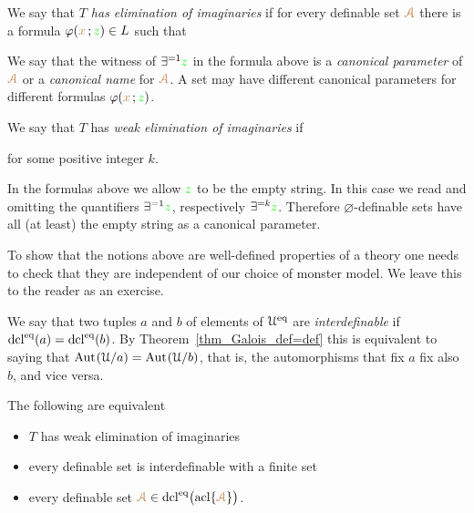 \begin{definition}\label{defelimanazioneimmaginari}
We say that \emph{$T$ has elimination of imaginaries\/} if for every definable set ${\color{brown}\EuScript A}$ there is a formula $\varphi({\color{brown} x}\,;{\color{green} z})\in L$ such that\smallskip


We say that the witness of $\exists^{=1}{\color{green} z}$ in the formula above is a \emph{canonical parameter\/} of ${\color{brown}\EuScript A}$ or a \emph{canonical name\/} for ${\color{brown}\EuScript A}$.
A set may have different canonical parameters for different formulas $\varphi({\color{brown} x}\,;{\color{green} z})$.

We say that $T$ has \emph{weak elimination of imaginaries\/} if\smallskip


for some positive integer $k$.
\end{definition}

In the formulas above we allow ${\color{green} z}$ to be the empty string.
In this case we read  and  omitting the quantifiers $\exists^{=1}{\color{green} z}$, respectively $\exists^{=k}{\color{green} z}$.
Therefore $\varnothing$-definable sets have all (at least) the empty string as a canonical parameter.

To show that the notions above are well-defined properties of a theory one needs to check that they are independent of our choice of monster model.
We leave this to the reader as an exercise.

We say that two tuples $a$ and $b$ of elements of $\EuScript U^{{\rm eq}}$ are \emph{interdefinable\/} if ${\rm dcl}^{{\rm eq}}(a)={\rm dcl}^{{\rm eq}}(b)$.
By Theorem~\ref{thm_Galois_def=def} this is equivalent to saying that ${\rm Aut\kern.15ex}(\EuScript U/a)={\rm Aut\kern.15ex}(\EuScript U/b)$, that is, the automorphisms that fix $a$ fix also $b$, and vice versa.

\begin{theorem}\label{thm_elimimd}
The following are equivalent
\begin{itemize}
\item[1.] $T$ has weak elimination of imaginaries
\item[2.] every definable set is interdefinable with a finite set
\item[3.] every definable set ${\color{brown}\EuScript A}\in{\rm dcl}^{{\rm eq}}\big({\rm acl}\{{\color{brown}\EuScript A}\}\big)$.
\end{itemize}
\end{theorem}


